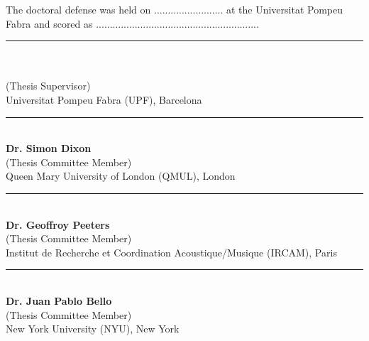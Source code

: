 \thispagestyle{empty}


\newcommand\advisor[2]{
\vspace{1.3cm}
\begin{center}
	\rule{6cm}{0.8pt}\\
	\textbf{#1}\\
	(Thesis Supervisor)\\
	#2
\end{center}
}
\newcommand\member[2]{
\vspace{1.3cm}
\begin{center}
	\rule{6cm}{0.8pt}\\
	\textbf{#1}\\
	(Thesis Committee Member) \\
	#2
\end{center}
} 

\noindent The doctoral defense was held on ......................... at the Universitat Pompeu Fabra and scored as ...........................................................\par
\advisor{\supervisor}{Universitat Pompeu Fabra (UPF), Barcelona}
\vspace*{0.3cm}

\member{Dr. Simon Dixon}{Queen Mary University of London (QMUL), London}
\member{Dr. Geoffroy Peeters}{Institut de Recherche et Coordination Acoustique/Musique (IRCAM), Paris}
\member{Dr. Juan Pablo Bello}{New York University (NYU), New York}
%
%
%
%
  

